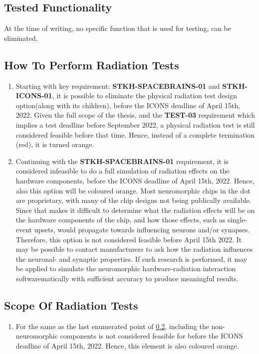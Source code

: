 \subsection{Tested Functionality}\label{subsec:tested_functionality}
At the time of writing, no specific function that is used for testing, can be eliminated.
\subsection{How To Perform Radiation Tests}\label{subsec:baseline_how_to_perform_radiation_tests}
\begin{enumerate}
    \item Starting with key requirement: \textbf{STKH-SPACEBRAINS-01} and \textbf{STKH-ICONS-01}, it is possible to eliminate the physical radiation test design option(along with its children), before the ICONS deadline of April 15th, 2022. Given the full scope of the thesis, and the \textbf{TEST-03} requirement which implies a test deadline before September 2022, a physical radiation test is still considered feasible before that time. Hence, instead of a complete termination (red), it is turned orange.
    \item Continuing with the \textbf{STKH-SPACEBRAINS-01} requirement, it is considered infeasible to do a full simulation of radiation effects on the hardware components, before the ICONS deadline of April 15th, 2022. Hence, also this option will be coloured orange. Most neuromorphic chips in the \acrshort{dot} are proprietary, with many of the chip designs not being publically available. Since that makes it difficult to determine what the radiation effects will be on the hardware components of the chip, and how those effects, such as single-event upsets, would propagate towards influencing neurons and/or synapses. Therefore, this option is not considered feasible before April 15th 2022. It may be possible to contact manufacturers to ask how the radiation influences the neuronal- and synaptic properties. If such research is performed, it may be applied to simulate the neuromorphic hardware-radiation interaction softwarematically with sufficient accuracy to produce meaningful results.
\end{enumerate}   
\subsection{Scope Of Radiation Tests}\label{subsec:baseline_scope_of_radiation_tests}
\begin{enumerate}
    \item For the same as the last enumerated point of \cref{subsec:baseline_how_to_perform_radiation_tests}, including the non-neuromorphic components is not considered feasible for before the ICONS deadline of April 15th, 2022. Hence, this element is also coloured orange.
\end{enumerate}

